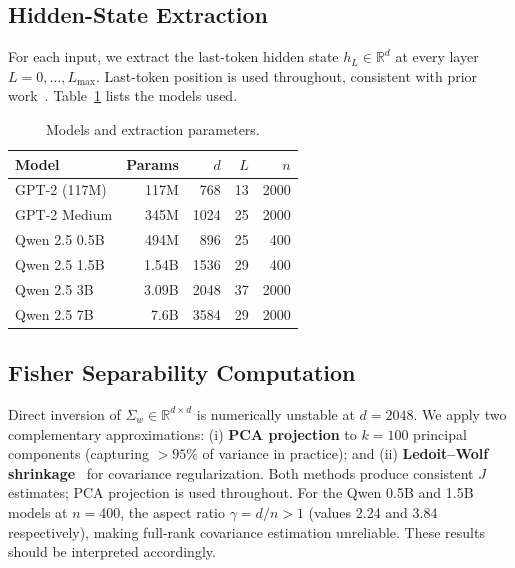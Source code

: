 \documentclass[10pt,twocolumn]{article}
\newcommand{\FloatBarrier}{\clearpage}
\begin{document}
\subsection{Hidden-State Extraction}
\label{sec:setup-extraction}

For each input, we extract the last-token hidden state $h_L \in \mathbb{R}^d$
at every layer $L = 0, \ldots, L_{\max}$.  Last-token position is used
throughout, consistent with prior work~\citep{azaria2023internal,
du2024haloscope}.  Table~\ref{tab:models} lists the models used.

\begin{table}[!htbp]
\centering
\caption{Models and extraction parameters.}
\label{tab:models}
\small
\setlength{\tabcolsep}{4pt}
\begin{tabular}{lrrrr}
\toprule
\textbf{Model} & \textbf{Params} & $d$ & $L$ & $n$ \\
\midrule
GPT-2 (117M)       & 117M  & 768  & 13 & 2000 \\
GPT-2 Medium       & 345M  & 1024 & 25 & 2000 \\
Qwen 2.5 0.5B      & 494M  & 896  & 25 & 400  \\
Qwen 2.5 1.5B      & 1.54B & 1536 & 29 & 400  \\
Qwen 2.5 3B        & 3.09B & 2048 & 37 & 2000 \\
Qwen 2.5 7B        & 7.6B  & 3584 & 29 & 2000 \\
\bottomrule
\end{tabular}
\end{table}

\subsection{Fisher Separability Computation}
\label{sec:setup-fisher}

Direct inversion of $\Sigma_w \in \mathbb{R}^{d \times d}$ is numerically
unstable at $d = 2048$. We apply two complementary approximations:
(i) \textbf{PCA projection} to $k = 100$ principal components
(capturing $> 95\%$ of variance in practice); and
(ii) \textbf{Ledoit--Wolf shrinkage}~\citep{ledoit2004} for covariance
regularization. Both methods produce consistent $J$ estimates; PCA
projection is used throughout. For the Qwen 0.5B and 1.5B models at
$n = 400$, the aspect ratio $\gamma = d/n > 1$ (values 2.24 and 3.84
respectively), making full-rank covariance estimation unreliable. These
results should be interpreted accordingly.

\FloatBarrier
\end{document}
